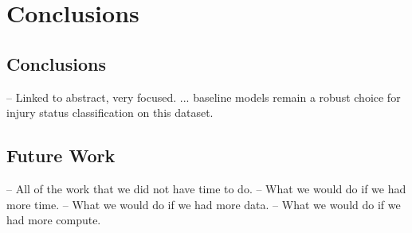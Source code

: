 \chapter{Conclusions}\label{chap:conclusions}

\section{Conclusions}\label{sec:conclusions}
-- Linked to abstract, very focused.
... baseline models remain a robust choice for injury status classification on this dataset.

\section{Future Work}\label{sec:future-work}
-- All of the work that we did not have time to do.
-- What we would do if we had more time.
-- What we would do if we had more data.
-- What we would do if we had more compute.
